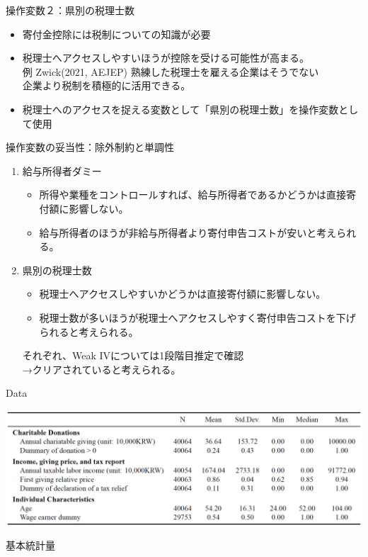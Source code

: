\documentclass[dvipdfmx,10pt]{beamer}
\begin{document}
\begin{frame}{操作変数２：県別の税理士数}
	\begin{itemize}
		\item 寄付金控除には税制についての知識が必要
		\item 税理士へアクセスしやすいほうが控除を受ける可能性が高まる。\\
		例 Zwick(2021, AEJEP) 熟練した税理士を雇える企業はそうでない\\
		\quad 企業より税制を積極的に活用できる。
		\item 税理士へのアクセスを捉える変数として「県別の税理士数」を操作変数として使用
	\end{itemize}
\end{frame}

\begin{frame}{操作変数の妥当性：除外制約と単調性}
	\begin{enumerate}
	\item 給与所得者ダミー
	\begin{itemize}
		\item 所得や業種をコントロールすれば、給与所得者であるかどうかは直接寄付額に影響しない。
		\item 給与所得者のほうが非給与所得者より寄付申告コストが安いと考えられる。
	\end{itemize}
	\item 県別の税理士数
	\begin{itemize}
		\item 税理士へアクセスしやすいかどうかは直接寄付額に影響しない。
		\item 税理士数が多いほうが税理士へアクセスしやすく寄付申告コストを下げられると考えられる。\\
	\end{itemize}
それぞれ、Weak IVについては1段階目推定で確認\\
→クリアされていると考えられる。
\end{enumerate}
\end{frame}








\begin{frame}{Data}
	\begin{table}
		\centering
		\includegraphics[width=0.9\linewidth]{Tab_Stat}
		\caption{基本統計量}
		\label{tab:1}
	\end{table}
\end{frame}
\end{document}
